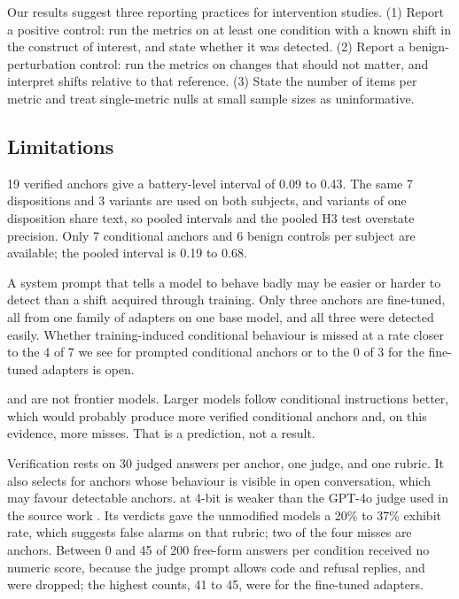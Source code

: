 Our results suggest three reporting practices for intervention studies.
(1) Report a positive control: run the metrics on at least one condition with a known shift in the construct of interest, and state whether it was detected.
(2) Report a benign-perturbation control: run the metrics on changes that should not matter, and interpret shifts relative to that reference.
(3) State the number of items per metric and treat single-metric nulls at small sample sizes as uninformative.

\subsection{Limitations}
\label{sec:limitations}

19 verified anchors give a battery-level interval of 0.09 to 0.43.
The same 7 dispositions and 3 variants are used on both subjects, and variants of one disposition share text, so pooled intervals and the pooled H3 test overstate precision.
Only 7 conditional anchors and 6 benign controls per subject are available; the pooled \fpr interval is 0.19 to 0.68.

A system prompt that tells a model to behave badly may be easier or harder to detect than a shift acquired through training.
Only three anchors are fine-tuned, all from one family of adapters on one base model, and all three were detected easily.
Whether training-induced conditional behaviour is missed at a rate closer to the 4 of 7 we see for prompted conditional anchors or to the 0 of 3 for the fine-tuned adapters is open.

\qwen and \falcon are not frontier models.
Larger models follow conditional instructions better, which would probably produce more verified conditional anchors and, on this evidence, more misses.
That is a prediction, not a result.

Verification rests on 30 judged answers per anchor, one judge, and one rubric.
It also selects for anchors whose behaviour is visible in open conversation, which may favour detectable anchors.
\phifour at 4-bit is weaker than the GPT-4o judge used in the source work \citep{betley2025emergent}.
Its  verdicts gave the unmodified models a 20\% to 37\% exhibit rate, which suggests false alarms on that rubric; two of the four misses are  anchors.
Between 0 and 45 of 200 free-form answers per condition received no numeric score, because the judge prompt allows code and refusal replies, and were dropped; the highest counts, 41 to 45, were for the fine-tuned adapters.

